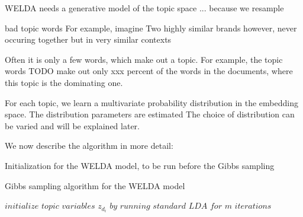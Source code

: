\documentclass[
        a4paper,
        titlepage,
        twoside,
        parskip
        ]{scrbook}
\theoremstyle{break}
\begin{document}
WELDA needs a generative model of the topic space ... because we resample


bad topic words
For example, imagine
Two highly similar brands
however, never occuring together
but in very similar contexts

Often it is only a few words, which make out a topic.
For example, the topic words TODO make out only xxx percent of the words in the documents, where this topic is the dominating one.

For each topic, we learn a multivariate probability distribution in the embedding space.
The distribution parameters are estimated
The choice of distribution can be varied and will be explained later.

We now describe the algorithm in more detail:

\begin{algorithm}
  \caption{Initialization for the WELDA model, to be run before the Gibbs sampling}
  \label{alg:welda_init}
  \begin{algorithmic}[1]
    \EndFor
    \EndProcedure
  \end{algorithmic}
\end{algorithm}

\begin{algorithm}
  \caption{Gibbs sampling algorithm for the WELDA model}
  \label{alg:welda_gibbs_sampling}
  \begin{algorithmic}[1]
    \State $\textit{initialize topic variables } z_{d_i} \textit{ by running standard LDA for } m \textit{ iterations}$
          \EndIf
        \EndFor
      \EndFor
    \EndFor
    \EndProcedure
  \end{algorithmic}
\end{algorithm}
\end{document}
